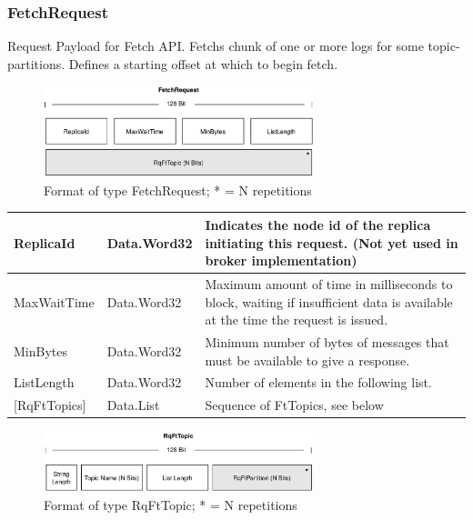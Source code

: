 \subsubsection{FetchRequest}
\label{subsubsec:protocol-fetchrequest}

Request Payload for Fetch API. Fetchs chunk of one or more logs for some
topic-partitions. Defines a starting offset at which to begin fetch. 

\begin{figure}[H]
    \centering
    \includegraphics[width=0.7\textwidth]{images/impl-prot-types-fetchRequest.png}
    \caption{Format of type FetchRequest; * = N repetitions }
    \label{fig:impl-prot-types-fetchRequest}
\end{figure}

\begin{table}[H]
\centering
\begin{tabular}{ l  l  p{11cm} }
\hline
ReplicaId      & Data.Word32 & Indicates the node id of the replica initiating this request. (Not yet used in broker implementation)                        \\ \hline
MaxWaitTime    & Data.Word32 & Maximum amount of time in milliseconds to block, waiting if insufficient data is available at the time the request is issued. \\ \hline
MinBytes       & Data.Word32 & Minimum number of bytes of messages that must be available to give a response.                                               \\ \hline
ListLength     & Data.Word32 & Number of elements in the following list.                                                                                        \\ \hline
{[}RqFtTopics{]} & Data.List   & Sequence of FtTopics, see below                                                                                              \\ \hline
\end{tabular}
\end{table}

\begin{figure}[H]
    \centering
    \includegraphics[width=0.7\textwidth]{images/impl-prot-types-ftTopic.png}
    \caption{Format of type RqFtTopic; * = N repetitions }
    \label{fig:impl-prot-types-ftTopic}
\end{figure}

